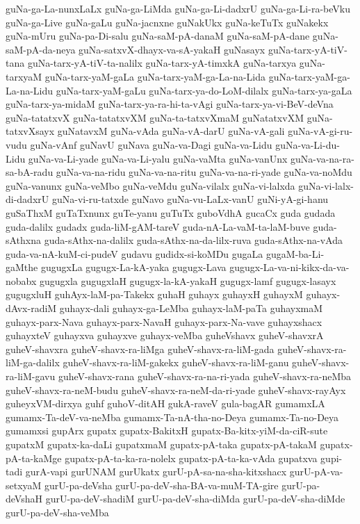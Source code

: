 {guNa-ga-La-nunxLaLx
guNa-ga-LiMda
guNa-ga-Li-dadxrU
guNa-ga-Li-ra-beVku
guNa-ga-Live
guNa-gaLu
guNa-jacnxne
guNakUkx
guNa-keTuTx
guNakekx
guNa-mUru
guNa-pa-Di-salu
guNa-saM-pA-danaM
guNa-saM-pA-dane
guNa-saM-pA-da-neya
guNa-satxvX-dhayx-va-sA-yakaH
guNasayx
guNa-tarx-yA-tiV-tana
guNa-tarx-yA-tiV-ta-nalilx
guNa-tarx-yA-timxkA
guNa-tarxya
guNa-tarxyaM
guNa-tarx-yaM-gaLa
guNa-tarx-yaM-ga-La-na-Lida
guNa-tarx-yaM-ga-La-na-Lidu
guNa-tarx-yaM-gaLu
guNa-tarx-ya-do-LoM-dilalx
guNa-tarx-ya-gaLa
guNa-tarx-ya-midaM
guNa-tarx-ya-ra-hi-ta-vAgi
guNa-tarx-ya-vi-BeV-deVna
guNa-tatatxvX
guNa-tatatxvXM
guNa-ta-tatxvXmaM
guNatatxvXM
guNa-tatxvXsayx
guNatavxM
guNa-vAda
guNa-vA-darU
guNa-vA-gali
guNa-vA-gi-ru-vudu
guNa-vAnf
guNavU
guNava
guNa-va-Dagi
guNa-va-Lidu
guNa-va-Li-du-Lidu
guNa-va-Li-yade
guNa-va-Li-yalu
guNa-vaMta
guNa-vanUnx
guNa-va-na-ra-sa-bA-radu
guNa-va-na-ridu
guNa-va-na-ritu
guNa-va-na-ri-yade
guNa-va-noMdu
guNa-vanunx
guNa-veMbo
guNa-veMdu
guNa-vilalx
guNa-vi-lalxda
guNa-vi-lalx-di-dadxrU
guNa-vi-ru-tatxde
guNavo
guNa-vu-LaLx-vanU
guNi-yA-gi-hanu
guSaThxM
guTaTxnunx
guTe-yanu
guTuTx
guboVdhA
gucaCx
guda
gudada
guda-dalilx
gudadx
guda-liM-gAM-tareV
guda-nA-La-vaM-ta-laM-buve
guda-sAthxna
guda-sAthx-na-dalilx
guda-sAthx-na-da-lilx-ruva
guda-sAthx-na-vAda
guda-va-nA-kuM-ci-pudeV
gudavu
gudidx-si-koMDu
gugaLa
gugaM-ba-Li-gaMthe
gugugxLa
gugugx-La-kA-yaka
gugugx-Lava
gugugx-La-va-ni-kikx-da-va-nobabx
gugugxla
gugugxlaH
gugugx-la-kA-yakaH
gugugx-lamf
gugugx-lasayx
gugugxluH
guhAyx-laM-pa-Takekx
guhaH
guhayx
guhayxH
guhayxM
guhayx-dAvx-radiM
guhayx-dali
guhayx-ga-LeMba
guhayx-laM-paTa
guhayxmaM
guhayx-parx-Nava
guhayx-parx-NavaH
guhayx-parx-Na-vave
guhayxshacx
guhayxteV
guhayxva
guhayxve
guhayx-veMba
guheVshavx
guheV-shavxrA
guheV-shavxra
guheV-shavx-ra-liMga
guheV-shavx-ra-liM-gada
guheV-shavx-ra-liM-ga-dalilx
guheV-shavx-ra-liM-gakekx
guheV-shavx-ra-liM-ganu
guheV-shavx-ra-liM-gavu
guheV-shavx-rana
guheV-shavx-ra-na-ri-yada
guheV-shavx-ra-neMba
guheV-shavx-ra-neM-budu
guheV-shavx-ra-neM-da-ri-yade
guheV-shavx-rayAyx
guheyxVM-dirxya
guhf
guhoV-ditAH
gukA-raveV
gula-bagAR
gumamxLA
gumamx-Ta-deV-va-neMba
gumamx-Ta-nA-tha-no-Deya
gumamx-Ta-no-Deya
gumamxsi
gupArx
gupatx
gupatx-BakitxH
gupatx-Ba-kitx-yiM-da-ciR-sute
gupatxM
gupatx-ka-daLi
gupatxmaM
gupatx-pA-taka
gupatx-pA-takaM
gupatx-pA-ta-kaMge
gupatx-pA-ta-ka-ra-nolelx
gupatx-pA-ta-ka-vAda
gupatxva
gupi-tadi
gurA-vapi
gurUNAM
gurUkatx
gurU-pA-sa-na-sha-kitxshacx
gurU-pA-va-setxyaM
gurU-pa-deVsha
gurU-pa-deV-sha-BA-va-muM-TA-gire
gurU-pa-deVshaH
gurU-pa-deV-shadiM
gurU-pa-deV-sha-diMda
gurU-pa-deV-sha-diMde
gurU-pa-deV-sha-veMba
}
